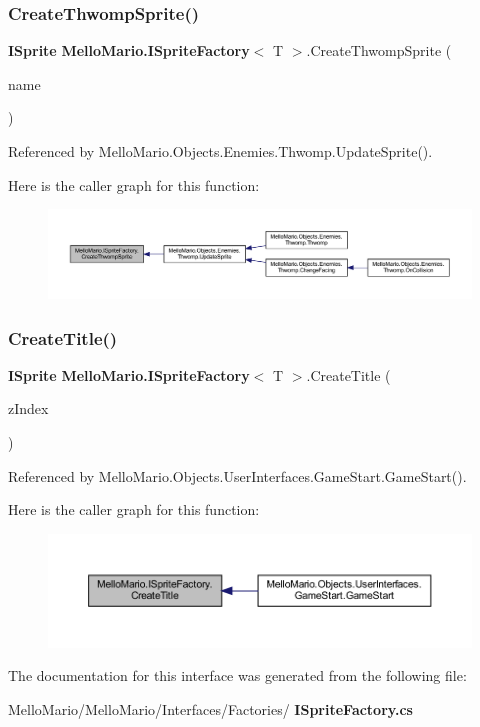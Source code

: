 \subsubsection{Create\+Thwomp\+Sprite()}
{\footnotesize\ttfamily \textbf{ I\+Sprite} \textbf{ Mello\+Mario.\+I\+Sprite\+Factory}$<$ T $>$.Create\+Thwomp\+Sprite (\begin{DoxyParamCaption}\item[{string}]{name }\end{DoxyParamCaption})}



Referenced by Mello\+Mario.\+Objects.\+Enemies.\+Thwomp.\+Update\+Sprite().

Here is the caller graph for this function\+:
\nopagebreak
\begin{figure}[H]
\begin{center}
\leavevmode
\includegraphics[width=350pt]{interfaceMelloMario_1_1ISpriteFactory_a168b290e1eb2d13f064f01ad43ef0b56_icgraph}
\end{center}
\end{figure}
\mbox{\label{interfaceMelloMario_1_1ISpriteFactory_aa7f42a4f118af2da0e467fe22048a71c}} 
\subsubsection{Create\+Title()}
{\footnotesize\ttfamily \textbf{ I\+Sprite} \textbf{ Mello\+Mario.\+I\+Sprite\+Factory}$<$ T $>$.Create\+Title (\begin{DoxyParamCaption}\item[{\textbf{ Z\+Index}}]{z\+Index }\end{DoxyParamCaption})}



Referenced by Mello\+Mario.\+Objects.\+User\+Interfaces.\+Game\+Start.\+Game\+Start().

Here is the caller graph for this function\+:
\nopagebreak
\begin{figure}[H]
\begin{center}
\leavevmode
\includegraphics[width=350pt]{interfaceMelloMario_1_1ISpriteFactory_aa7f42a4f118af2da0e467fe22048a71c_icgraph}
\end{center}
\end{figure}


The documentation for this interface was generated from the following file\+:\begin{DoxyCompactItemize}
\item 
Mello\+Mario/\+Mello\+Mario/\+Interfaces/\+Factories/\textbf{ I\+Sprite\+Factory.\+cs}\end{DoxyCompactItemize}
